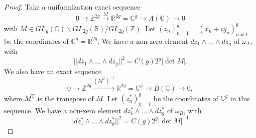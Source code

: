 \documentclass{amsart}
\theoremstyle{remark}
\numberwithin{equation}{section}
\newcommand{\Z}{\mathbb{Z}}
\newcommand{\R}{\mathbb{R}}
\newcommand{\C}{\mathbb{C}}
\newcommand{\GL}{\mathit{GL}}
\begin{document}
\begin{proof}
	Take a uniformization exact sequence
		\begin{equation} \label{0023}
				0
			\to
				\Z^{2 g}
			\stackrel{M}{\to}
				\R^{2 g}
			=
				\C^{g}
			\to
				A(\C)
			\to
				0
		\end{equation}
	with $M \in \GL_{g}(\C) \backslash \GL_{2 g}(\R) / \GL_{2 g}(\Z)$.
	Let $(z_{n})_{n = 1}^{g} = (x_{n} + i y_{n})_{n = 1}^{g}$ be
	the coordinates of $\C^{g} = \R^{2 g}$.
	We have a non-zero element $d z_{1} \wedge \dots \wedge d z_{g}$ of $\omega_{A}$,
	with
		\[
				||d z_{1} \wedge \dots \wedge d z_{g}||^{2}
			=
				C(g) 2^{g} |\det M|.
		\]
	We also have an exact sequence
		\begin{equation} \label{0024}
				0
			\to
				\Z^{2 g}
			\stackrel{(M^{\mathrm{T}})^{-1}}{\longrightarrow}
				\R^{2 g}
			=
				\C^{g}
			\to
				B(\C)
			\to
				0,
		\end{equation}
	where $M^{\mathrm{T}}$ is the transpose of $M$.
	Let $(z_{n}^{\ast})_{n = 1}^{g}$ be the coordinates
	of $\C^{g}$ in this sequence.
	We have a non-zero element
	$d z_{1}^{\ast} \wedge \dots \wedge d z_{g}^{\ast}$
	of $\omega_{B}$, with
		\[
				||d z_{1}^{\ast} \wedge \dots \wedge d z_{g}^{\ast}||^{2}
			=
				C(g) 2^{g} |\det M|^{-1}.
		\]
	

\end{proof}
\end{document}
